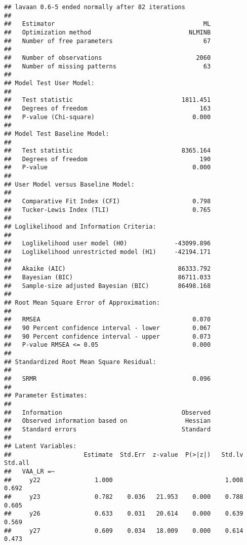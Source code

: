 \documentclass[
]{article}
\begin{document}
\begin{verbatim}
## lavaan 0.6-5 ended normally after 82 iterations
## 
##   Estimator                                         ML
##   Optimization method                           NLMINB
##   Number of free parameters                         67
##                                                       
##   Number of observations                          2060
##   Number of missing patterns                        63
##                                                       
## Model Test User Model:
##                                                       
##   Test statistic                              1811.451
##   Degrees of freedom                               163
##   P-value (Chi-square)                           0.000
## 
## Model Test Baseline Model:
## 
##   Test statistic                              8365.164
##   Degrees of freedom                               190
##   P-value                                        0.000
## 
## User Model versus Baseline Model:
## 
##   Comparative Fit Index (CFI)                    0.798
##   Tucker-Lewis Index (TLI)                       0.765
## 
## Loglikelihood and Information Criteria:
## 
##   Loglikelihood user model (H0)             -43099.896
##   Loglikelihood unrestricted model (H1)     -42194.171
##                                                       
##   Akaike (AIC)                               86333.792
##   Bayesian (BIC)                             86711.033
##   Sample-size adjusted Bayesian (BIC)        86498.168
## 
## Root Mean Square Error of Approximation:
## 
##   RMSEA                                          0.070
##   90 Percent confidence interval - lower         0.067
##   90 Percent confidence interval - upper         0.073
##   P-value RMSEA <= 0.05                          0.000
## 
## Standardized Root Mean Square Residual:
## 
##   SRMR                                           0.096
## 
## Parameter Estimates:
## 
##   Information                                 Observed
##   Observed information based on                Hessian
##   Standard errors                             Standard
## 
## Latent Variables:
##                    Estimate  Std.Err  z-value  P(>|z|)   Std.lv  Std.all
##   VAA_LR =~                                                             
##     y22               1.000                               1.008    0.692
##     y23               0.782    0.036   21.953    0.000    0.788    0.605
##     y26               0.633    0.031   20.614    0.000    0.639    0.569
##     y27               0.609    0.034   18.009    0.000    0.614    0.473

\end{verbatim}
\end{document}
